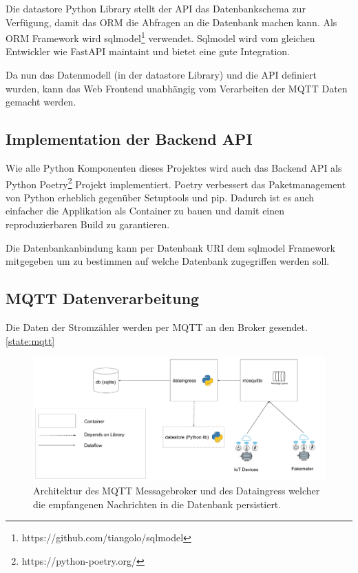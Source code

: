 Die datastore Python Library stellt der \ac{API} das Datenbankschema zur Verfügung,
damit das \ac{ORM} die Abfragen an die Datenbank machen kann.
Als \ac{ORM} Framework wird sqlmodel\footnote{https://github.com/tiangolo/sqlmodel} verwendet.
Sqlmodel wird vom gleichen Entwickler wie FastAPI maintaint und bietet eine gute Integration.

Da nun das Datenmodell (in der datastore Library) und die \ac{API} definiert wurden,
kann das Web Frontend unabhängig vom Verarbeiten der \ac{MQTT} Daten gemacht werden.

\subsection{Implementation der Backend \ac{API}}

Wie alle Python Komponenten dieses Projektes wird auch das Backend \ac{API}
als Python Poetry\footnote{https://python-poetry.org/} Projekt implementiert.
Poetry verbessert das Paketmanagement von Python erheblich gegenüber Setuptools
und pip. \cite{python_poetry}
Dadurch ist es auch einfacher die Applikation als Container zu bauen und
damit einen reproduzierbaren Build zu garantieren.

Die Datenbankanbindung kann per Datenbank \ac{URI} dem sqlmodel Framework
mitgegeben um zu bestimmen auf welche Datenbank zugegriffen werden soll.



\subsection{\ac{MQTT} Datenverarbeitung}

Die Daten der Stromzähler werden per \ac{MQTT} an den Broker gesendet. \ref{state:mqtt}

\begin{figure}[h]
    \centering
    \includegraphics[width=1.0\textwidth]{gfx/smic-arch-mqtt}
    \caption{
        Architektur des \ac{MQTT} Messagebroker und des Dataingress welcher die
        empfangenen Nachrichten in die Datenbank persistiert.
    }
    \label{fig:arch-mqtt}
\end{figure}

